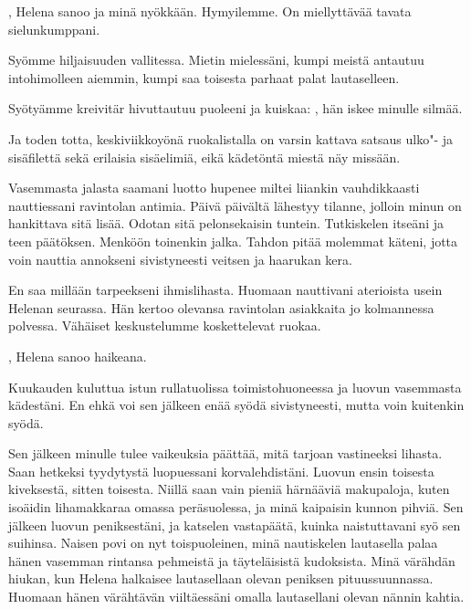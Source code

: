 \indent{}, Helena sanoo ja min\"{a} ny\"{o}kk\"{a}\"{a}n. Hymyilemme. On miellytt\"{a}v\"{a}\"{a} tavata sielunkumppani.

\indent{}Sy\"{o}mme hiljaisuuden vallitessa. Mietin mieless\"{a}ni, kumpi meist\"{a} antautuu intohimolleen aiemmin, kumpi saa toisesta parhaat palat lautaselleen.

\indent{}Sy\"{o}ty\"{a}mme kreivit\"{a}r hivuttautuu puoleeni ja kuiskaa: , h\"{a}n iskee minulle silm\"{a}\"{a}.

\indent{}Ja toden totta, keskiviikkoy\"{o}n\"{a} ruokalistalla on varsin kattava satsaus ulko"- ja sis\"{a}filett\"{a} sek\"{a} erilaisia sis\"{a}elimi\"{a}, eik\"{a} k\"{a}det\"{o}nt\"{a} miest\"{a} n\"{a}y miss\"{a}\"{a}n.



\subchapter{}\noindent{}Vasemmasta jalasta saamani luotto hupenee miltei liiankin vauhdikkaasti nauttiessani ravintolan antimia. P\"{a}iv\"{a} p\"{a}iv\"{a}lt\"{a} l\"{a}hestyy tilanne, jolloin minun on hankittava sit\"{a} lis\"{a}\"{a}. Odotan sit\"{a} pelonsekaisin tuntein. Tutkiskelen itse\"{a}ni ja teen p\"{a}\"{a}t\"{o}ksen. Menk\"{o}\"{o}n toinenkin jalka. Tahdon pit\"{a}\"{a} molemmat k\"{a}teni, jotta voin nauttia annokseni sivistyneesti veitsen ja haarukan kera.

\indent{}En saa mill\"{a}\"{a}n tarpeekseni ihmislihasta. Huomaan nauttivani aterioista usein Helenan seurassa. H\"{a}n kertoo olevansa ravintolan asiakkaita jo kolmannessa polvessa. V\"{a}h\"{a}iset keskustelumme koskettelevat ruokaa.

\indent{}, Helena sanoo haikeana. 

\indent{}Kuukauden kuluttua istun rullatuolissa toimistohuoneessa ja luovun vasemmasta k\"{a}dest\"{a}ni. En ehk\"{a} voi sen j\"{a}lkeen en\"{a}\"{a} sy\"{o}d\"{a} sivistyneesti, mutta voin kuitenkin sy\"{o}d\"{a}.

\indent{}Sen j\"{a}lkeen minulle tulee vaikeuksia p\"{a}\"{a}tt\"{a}\"{a}, mit\"{a} tarjoan vastineeksi lihasta. Saan hetkeksi tyydytyst\"{a} luopuessani korvalehdist\"{a}ni. Luovun ensin toisesta kiveksest\"{a}, sitten toisesta. Niill\"{a} saan vain pieni\"{a} h\"{a}rn\"{a}\"{a}vi\"{a} makupaloja, kuten iso\"{a}idin lihamakkaraa omassa per\"{a}suolessa, ja min\"{a} kaipaisin kunnon pihvi\"{a}. Sen j\"{a}lkeen luovun peniksest\"{a}ni, ja katselen vastap\"{a}\"{a}t\"{a}, kuinka naistuttavani sy\"{o} sen suihinsa. Naisen povi on nyt toispuoleinen, min\"{a} nautiskelen lautasella palaa h\"{a}nen vasemman rintansa pehmeist\"{a} ja t\"{a}ytel\"{a}isist\"{a} kudoksista. Min\"{a} v\"{a}r\"{a}hd\"{a}n hiukan, kun Helena halkaisee lautasellaan olevan peniksen pituussuunnassa. Huomaan h\"{a}nen v\"{a}r\"{a}ht\"{a}v\"{a}n viilt\"{a}ess\"{a}ni omalla lautasellani olevan n\"{a}nnin kahtia.

